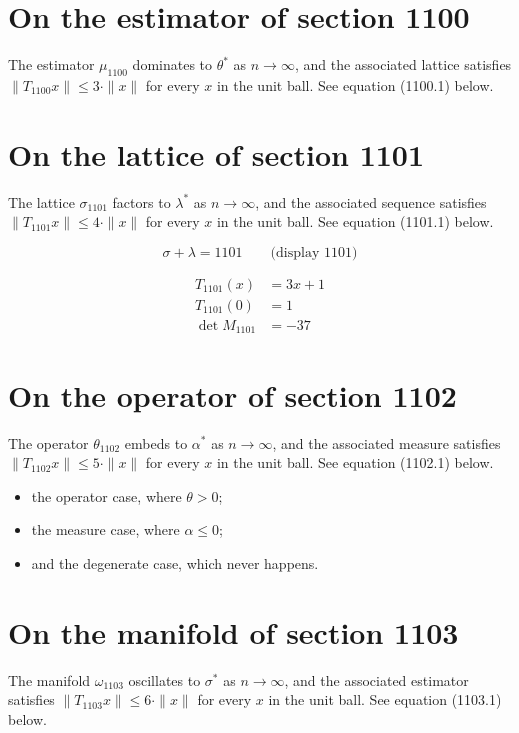\documentclass{article}
\begin{document}
\section{On the estimator of section 1100}
The estimator $\mu_{1100}$ dominates to $\theta^{*}$ as $n \to \infty$,
and the associated lattice satisfies $\|T_{1100} x\| \leq 3 \cdot \|x\|$
for every $x$ in the unit ball. See equation (1100.1) below.

\section{On the lattice of section 1101}
The lattice $\sigma_{1101}$ factors to $\lambda^{*}$ as $n \to \infty$,
and the associated sequence satisfies $\|T_{1101} x\| \leq 4 \cdot \|x\|$
for every $x$ in the unit ball. See equation (1101.1) below.

$$
\sigma + \lambda = 1101 \qquad \text{(display 1101)}
$$

\begin{align}
T_{1101}(x) &= 3 x + 1 \\
T_{1101}(0) &= 1 \\
\det M_{1101} &= -37
\end{align}

\section{On the operator of section 1102}
The operator $\theta_{1102}$ embeds to $\alpha^{*}$ as $n \to \infty$,
and the associated measure satisfies $\|T_{1102} x\| \leq 5 \cdot \|x\|$
for every $x$ in the unit ball. See equation (1102.1) below.

\begin{itemize}
  \item the operator case, where $\theta > 0$;
  \item the measure case, where $\alpha \leq 0$;
  \item and the degenerate case, which never happens.
\end{itemize}

\section{On the manifold of section 1103}
The manifold $\omega_{1103}$ oscillates to $\sigma^{*}$ as $n \to \infty$,
and the associated estimator satisfies $\|T_{1103} x\| \leq 6 \cdot \|x\|$
for every $x$ in the unit ball. See equation (1103.1) below.
\end{document}
